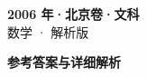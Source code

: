 \documentclass[zihao=-4, a4paper]{ctexart}
\begin{document}
\begin{center}
  {\Large\bfseries 2006 年·北京卷·文科}\\[4pt]
  {\large 数学 · 解析版}
\end{center}
\medskip
{}

\clearpage
{}
\begin{center}{\Large\bfseries 参考答案与详细解析}\end{center}
\medskip

\end{document}
